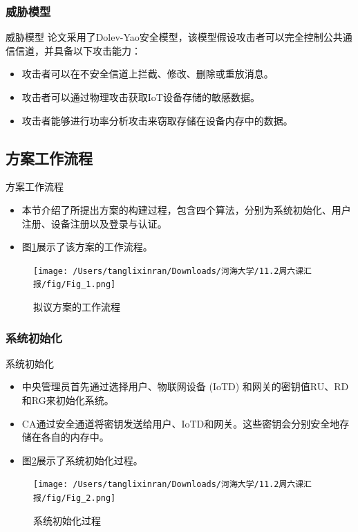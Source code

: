 \documentclass{beamer}
\begin{document}
\subsubsection{威胁模型}
\begin{frame}{威胁模型}
    论文采用了Dolev-Yao安全模型，该模型假设攻击者可以完全控制公共通信信道，并具备以下攻击能力：
    \begin{itemize}
        \item 攻击者可以在不安全信道上拦截、修改、删除或重放消息。
        \item 攻击者可以通过物理攻击获取IoT设备存储的敏感数据。
        \item 攻击者能够进行功率分析攻击来窃取存储在设备内存中的数据。
    \end{itemize}
\end{frame}

\subsection{方案工作流程}
\begin{frame}{方案工作流程}
    \begin{itemize}
        \item 本节介绍了所提出方案的构建过程，包含四个算法，分别为系统初始化、用户注册、设备注册以及登录与认证。
        \item 图\ref{Fig_1}展示了该方案的工作流程。
    \end{itemize}

    \begin{figure}
        \centering
        \texttt{[image: /Users/tanglixinran/Downloads/河海大学/11.2周六课汇报/fig/Fig\_1.png]}
        \caption{拟议方案的工作流程}
        \label{Fig_1}
    \end{figure}
\end{frame}

\subsubsection{系统初始化}
\begin{frame}{系统初始化}
    \begin{itemize}
        \item 中央管理员首先通过选择用户、物联网设备 (IoTD) 和网关的密钥值RU、RD和RG来初始化系统。
        \item CA通过安全通道将密钥发送给用户、IoTD和网关。这些密钥会分别安全地存储在各自的内存中。
        \item 图\ref{Fig_2}展示了系统初始化过程。
    \end{itemize}

    \begin{figure}
        \centering
        \texttt{[image: /Users/tanglixinran/Downloads/河海大学/11.2周六课汇报/fig/Fig\_2.png]} %
        \caption{系统初始化过程}
        \label{Fig_2}
    \end{figure}
\end{frame}
\end{document}
